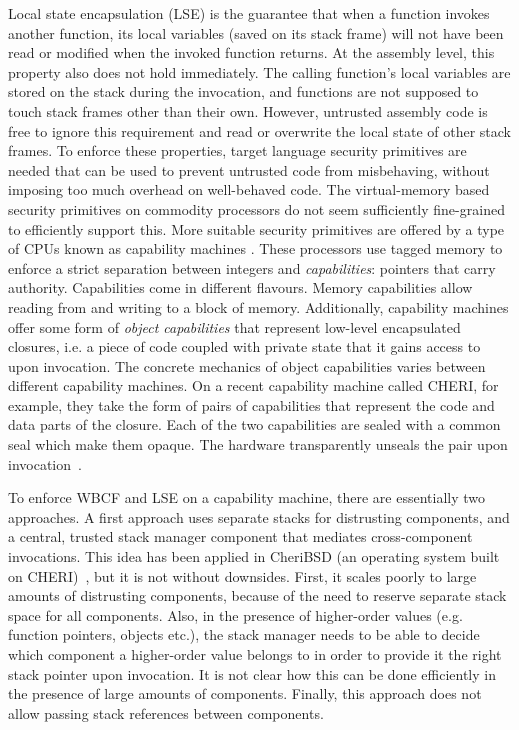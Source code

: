 \documentclass[acmsmall,review,anonymous]{acmart}\settopmatter{printfolios=true,printccs=false,printacmref=false}
\begin{document}
Local state encapsulation (LSE) is the guarantee that when a function invokes another function, its local variables (saved on its stack frame) will not have been read or modified when the invoked function returns.
At the assembly level, this property also does not hold immediately.
The calling function's local variables are stored on the stack during the invocation, and functions are not supposed to touch stack frames other than their own.
However, untrusted assembly code is free to ignore this requirement and read or overwrite the local state of other stack frames.
To enforce these properties, target language security primitives are needed that can be used to prevent untrusted code from misbehaving, without imposing too much overhead on well-behaved code.
The virtual-memory based security primitives on commodity processors do not seem sufficiently fine-grained to efficiently support this.
More suitable security primitives are offered by a type of CPUs known as capability machines \citep{levy_capability-based_1984,watson_cheri:_2015}.
These processors use tagged memory to enforce a strict separation between integers and {\itshape capabilities}: pointers that carry authority.
Capabilities come in different flavours.
Memory capabilities allow reading from and writing to a block of memory.
Additionally, capability machines offer some form of {\itshape object capabilities} that represent low-level encapsulated closures, i.e. a piece of code coupled with private state that it gains access to upon invocation.
The concrete mechanics of object capabilities varies between different capability machines.
On a recent capability machine called CHERI, for example, they take the form of pairs of capabilities that represent the code and data parts of the closure.
Each of the two capabilities are sealed with a common seal which make them opaque.
The hardware transparently unseals the pair upon invocation~\citep{watson_capability_2015}.

To enforce WBCF and LSE on a capability machine, there are essentially two approaches.
A first approach uses separate stacks for distrusting components, and a central, trusted stack manager component that mediates cross-component invocations.
This idea has been applied in CheriBSD (an operating system built on CHERI)~\citep{watson_capability_2015}, but it is not without downsides.
First, it scales poorly to large amounts of distrusting components, because of the need to reserve separate stack space for all components.
Also, in the presence of higher-order values (e.g. function pointers, objects etc.), the stack manager needs to be able to decide which component a higher-order value belongs to in order to provide it the right stack pointer upon invocation.
It is not clear how this can be done efficiently in the presence of large amounts of components.
Finally, this approach does not allow passing stack references between components.
\end{document}
